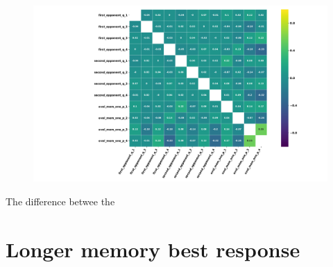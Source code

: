 \documentclass[10pt]{article}
\begin{document}
\begin{figure}
    \centering
    \includegraphics[width=\textwidth]{img/evo_correlation.pdf}
\end{figure}

The difference betwee the 

\section{Longer memory best response}



\end{document}
